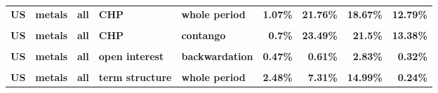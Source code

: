 \documentclass[
  authoryear,
  preprint,
  3p]{elsarticle}
\begin{document}
\begin{landscape}
\begin{longtable}[t]{>{}l>{}l>{}l>{}l>{}l>{}r>{}r>{}r>{}r}
\textbf{US} & \textbf{metals} & \textbf{all} & \textbf{CHP} & \textbf{whole period} & \textcolor[HTML]{4285f4}{\textbf{1.07\%}} & \textcolor[HTML]{4285f4}{\textbf{21.76\%}} & \textcolor[HTML]{4285f4}{\textbf{18.67\%}} & \textcolor[HTML]{4285f4}{\textbf{12.79\%}}\\
\textbf{\cellcolor{gray!10}{US}} & \textbf{\cellcolor{gray!10}{metals}} & \textbf{\cellcolor{gray!10}{all}} & \textbf{\cellcolor{gray!10}{CHP}} & \textbf{\cellcolor{gray!10}{backwardation}} & \textcolor[HTML]{4285f4}{\textbf{\cellcolor{gray!10}{1.66\%}}} & \textcolor[HTML]{4285f4}{\textbf{\cellcolor{gray!10}{20.33\%}}} & \textcolor[HTML]{4285f4}{\textbf{\cellcolor{gray!10}{15.15\%}}} & \textcolor[HTML]{4285f4}{\textbf{\cellcolor{gray!10}{12.71\%}}}\\
\textbf{US} & \textbf{metals} & \textbf{all} & \textbf{CHP} & \textbf{contango} & \textcolor[HTML]{4285f4}{\textbf{0.7\%}} & \textcolor[HTML]{4285f4}{\textbf{23.49\%}} & \textcolor[HTML]{4285f4}{\textbf{21.5\%}} & \textcolor[HTML]{4285f4}{\textbf{13.38\%}}\\
\textbf{\cellcolor{gray!10}{US}} & \textbf{\cellcolor{gray!10}{metals}} & \textbf{\cellcolor{gray!10}{all}} & \textbf{\cellcolor{gray!10}{open interest}} & \textbf{\cellcolor{gray!10}{whole period}} & \textcolor[HTML]{4285f4}{\textbf{\cellcolor{gray!10}{0.5\%}}} & \textcolor[HTML]{4285f4}{\textbf{\cellcolor{gray!10}{0.91\%}}} & \textcolor[HTML]{4285f4}{\textbf{\cellcolor{gray!10}{3.68\%}}} & \textcolor[HTML]{4285f4}{\textbf{\cellcolor{gray!10}{0.27\%}}}\\
\addlinespace
\textbf{US} & \textbf{metals} & \textbf{all} & \textbf{open interest} & \textbf{backwardation} & \textcolor[HTML]{4285f4}{\textbf{0.47\%}} & \textcolor[HTML]{4285f4}{\textbf{0.61\%}} & \textcolor[HTML]{4285f4}{\textbf{2.83\%}} & \textcolor[HTML]{4285f4}{\textbf{0.32\%}}\\
\textbf{\cellcolor{gray!10}{US}} & \textbf{\cellcolor{gray!10}{metals}} & \textbf{\cellcolor{gray!10}{all}} & \textbf{\cellcolor{gray!10}{open interest}} & \textbf{\cellcolor{gray!10}{contango}} & \textcolor[HTML]{4285f4}{\textbf{\cellcolor{gray!10}{0.61\%}}} & \textcolor[HTML]{4285f4}{\textbf{\cellcolor{gray!10}{1.28\%}}} & \textcolor[HTML]{4285f4}{\textbf{\cellcolor{gray!10}{4.31\%}}} & \textcolor[HTML]{4285f4}{\textbf{\cellcolor{gray!10}{0.24\%}}}\\
\textbf{US} & \textbf{metals} & \textbf{all} & \textbf{term structure} & \textbf{whole period} & \textcolor[HTML]{4285f4}{\textbf{2.48\%}} & \textcolor[HTML]{4285f4}{\textbf{7.31\%}} & \textcolor[HTML]{4285f4}{\textbf{14.99\%}} & \textcolor[HTML]{4285f4}{\textbf{0.24\%}}\\

\end{longtable}
\end{landscape}
\end{document}
